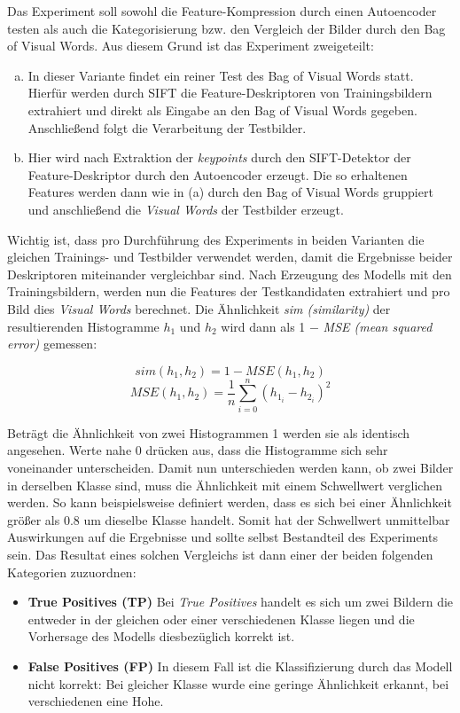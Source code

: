 Das Experiment soll sowohl die Feature-Kompression durch einen Autoencoder testen als auch die Kategorisierung bzw. den Vergleich der Bilder durch den Bag of Visual Words. Aus diesem Grund ist das Experiment zweigeteilt: 

\begin{enumerate}[(a)]%
	\item In dieser Variante findet ein reiner Test des Bag of Visual Words statt. Hierfür werden durch SIFT die Feature-Deskriptoren von Trainingsbildern extrahiert und direkt als Eingabe an den Bag of Visual Words gegeben. Anschließend folgt die Verarbeitung der Testbilder.
	\item Hier wird nach Extraktion der \textit{keypoints} durch den SIFT-Detektor der Feature-Deskriptor durch den Autoencoder erzeugt. Die so erhaltenen Features werden dann wie in (a) durch den Bag of Visual Words gruppiert und anschließend die \textit{Visual Words} der Testbilder erzeugt.
\end{enumerate}

Wichtig ist, dass pro Durchführung des Experiments in beiden Varianten die gleichen Trainings- und Testbilder verwendet werden, damit die Ergebnisse beider Deskriptoren miteinander vergleichbar sind. \newline
Nach Erzeugung des Modells mit den Trainingsbildern, werden nun die Features der Testkandidaten extrahiert und pro Bild dies \textit{Visual Words} berechnet. Die Ähnlichkeit \textit{sim (similarity)} der resultierenden Histogramme $h_1$ und $h_2$ wird dann als 1 $-$ \textit{MSE (mean squared error)} gemessen:

$$sim(h_1, h_2) = 1 - MSE(h_1, h_2)$$
$$MSE(h_1, h_2) = \frac{1}{n}\sum_{i=0}^{n}(h_{1_i} - h_{2_i})^{2}$$

Beträgt die Ähnlichkeit von zwei Histogrammen 1 werden sie als identisch angesehen. Werte nahe 0 drücken aus, dass die Histogramme sich sehr voneinander unterscheiden. Damit nun unterschieden werden kann, ob zwei Bilder in derselben Klasse sind, muss die Ähnlichkeit mit einem Schwellwert verglichen werden. So kann beispielsweise definiert werden, dass es sich bei einer Ähnlichkeit größer als $0.8$ um dieselbe Klasse handelt. Somit hat der Schwellwert unmittelbar Auswirkungen auf die Ergebnisse und sollte selbst Bestandteil des Experiments sein. Das Resultat eines solchen Vergleichs ist dann einer der beiden folgenden Kategorien zuzuordnen:

\begin{itemize}
	\item \textbf{True Positives (TP)} Bei \textit{True Positives} handelt es sich um zwei Bildern die entweder in der gleichen oder einer verschiedenen Klasse liegen und die Vorhersage des Modells diesbezüglich korrekt ist.
	\item \textbf{False Positives (FP)} In diesem Fall ist die Klassifizierung durch das Modell nicht korrekt: Bei gleicher Klasse wurde eine geringe Ähnlichkeit erkannt, bei verschiedenen eine Hohe.
\end{itemize}

